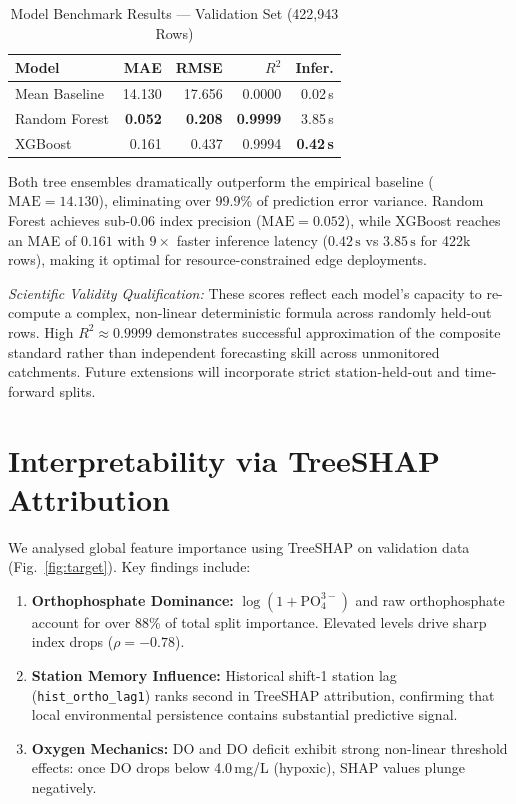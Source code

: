 \documentclass[conference]{IEEEtran}
\begin{document}
\begin{table}[!t]
  \caption{Model Benchmark Results --- Validation Set (422,943 Rows)}
  \label{tab:model_comparison}
  \centering
  \setlength{\tabcolsep}{4pt}
  \begin{tabular}{lrrrr}
    \toprule
    \textbf{Model}
      & \textbf{MAE}
      & \textbf{RMSE}
      & \textbf{$R^2$}
      & \textbf{Infer.} \\
    \midrule
    Mean Baseline   & 14.130 & 17.656 & 0.0000 & 0.02\,s \\
    Random Forest   & \textbf{0.052} & \textbf{0.208} & \textbf{0.9999} & 3.85\,s \\
    XGBoost         &  0.161 &  0.437 & 0.9994 & \textbf{0.42\,s} \\
    \bottomrule
  \end{tabular}
\end{table}

Both tree ensembles dramatically outperform the empirical baseline
($\text{MAE} = 14.130$), eliminating over 99.9\% of prediction error
variance. Random Forest achieves sub-0.06 index precision
($\text{MAE} = 0.052$), while XGBoost reaches an MAE of $0.161$ with
$9{\times}$ faster inference latency ($0.42\,\text{s}$ vs $3.85\,\text{s}$
for 422k rows), making it optimal for resource-constrained edge deployments.

\smallskip
\noindent\textit{Scientific Validity Qualification:} These scores
reflect each model's capacity to re-compute a complex, non-linear
deterministic formula across randomly held-out rows. High
$R^2 \approx 0.9999$ demonstrates successful approximation of the
composite standard rather than independent forecasting skill across
unmonitored catchments. Future extensions will incorporate strict
station-held-out and time-forward splits.

\section{Interpretability via TreeSHAP Attribution}
\label{sec:shap}

We analysed global feature importance using TreeSHAP on validation
data (Fig.~\ref{fig:target}). Key findings include:
\begin{enumerate}
  \item \textbf{Orthophosphate Dominance:}
        $\log(1{+}\text{PO}_4^{3-})$ and raw orthophosphate account for
        over 88\% of total split importance. Elevated levels drive sharp
        index drops ($\rho = -0.78$).
  \item \textbf{Station Memory Influence:}
        Historical shift-1 station lag (\texttt{hist\_ortho\_lag1}) ranks
        second in TreeSHAP attribution, confirming that local
        environmental persistence contains substantial predictive signal.
  \item \textbf{Oxygen Mechanics:}
        DO and DO deficit exhibit strong non-linear threshold effects:
        once DO drops below 4.0\,mg/L (hypoxic), SHAP values plunge
        negatively.
\end{enumerate}
\end{document}
